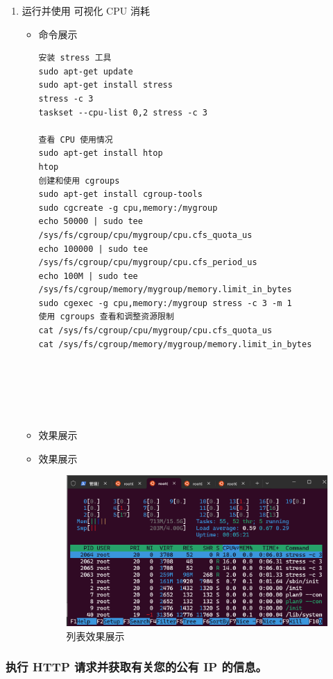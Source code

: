 \documentclass[UTF8]{ctexart}
\begin{document}
\begin{enumerate}
  \item 运行并使用 可视化 CPU 消耗
  \begin{itemize}
  \item 命令展示
  \begin{verbatim}
安装 stress 工具
sudo apt-get update
sudo apt-get install stress
stress -c 3
taskset --cpu-list 0,2 stress -c 3

查看 CPU 使用情况
sudo apt-get install htop
htop
创建和使用 cgroups
sudo apt-get install cgroup-tools
sudo cgcreate -g cpu,memory:/mygroup
echo 50000 | sudo tee /sys/fs/cgroup/cpu/mygroup/cpu.cfs_quota_us
echo 100000 | sudo tee /sys/fs/cgroup/cpu/mygroup/cpu.cfs_period_us
echo 100M | sudo tee /sys/fs/cgroup/memory/mygroup/memory.limit_in_bytes
sudo cgexec -g cpu,memory:/mygroup stress -c 3 -m 1
使用 cgroups 查看和调整资源限制
cat /sys/fs/cgroup/cpu/mygroup/cpu.cfs_quota_us
cat /sys/fs/cgroup/memory/mygroup/memory.limit_in_bytes






  \end{verbatim}
\item 效果展示
 \item 效果展示
  \begin{figure}[H]
    \centering
    \includegraphics[width=\textwidth]{142} %
    \caption{列表效果展示}
  \end{figure}
  \end{itemize}
\end{enumerate}


\subsubsection{执行 HTTP 请求并获取有关您的公有 IP 的信息。}
\end{document}
